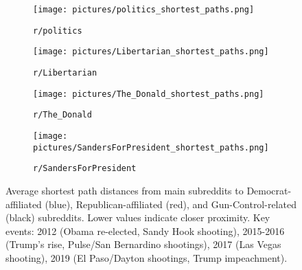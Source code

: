 \documentclass{article}
\begin{document}
\begin{figure}[H]
    \centering
    \begin{subfigure}[b]{0.48\textwidth}
        \texttt{[image: pictures/politics\_shortest\_paths.png]}
        \caption{\texttt{r/politics}}
        \label{fig:politics_paths}
    \end{subfigure}
    \hfill
    \begin{subfigure}[b]{0.48\textwidth}
        \texttt{[image: pictures/Libertarian\_shortest\_paths.png]}
        \caption{\texttt{r/Libertarian}}
        \label{fig:libertarian_paths}
    \end{subfigure}
    
    \vspace{1em} %
    
    \begin{subfigure}[b]{0.48\textwidth}
        \texttt{[image: pictures/The\_Donald\_shortest\_paths.png]}
        \caption{\texttt{r/The\_Donald}}
        \label{fig:thedonald_paths}
    \end{subfigure}
    \hfill
    \begin{subfigure}[b]{0.48\textwidth}
        \texttt{[image: pictures/SandersForPresident\_shortest\_paths.png]}
        \caption{\texttt{r/SandersForPresident}}
        \label{fig:sanders_paths}
    \end{subfigure}
    \caption{Average shortest path distances from main subreddits to Democrat-affiliated (blue), Republican-affiliated (red), and Gun-Control-related (black) subreddits. Lower values indicate closer proximity. Key events: 2012 (Obama re-elected, Sandy Hook shooting), 2015-2016 (Trump's rise, Pulse/San Bernardino shootings), 2017 (Las Vegas shooting), 2019 (El Paso/Dayton shootings, Trump impeachment).}
    \label{fig:shortest_paths_all}
\end{figure}
\end{document}
